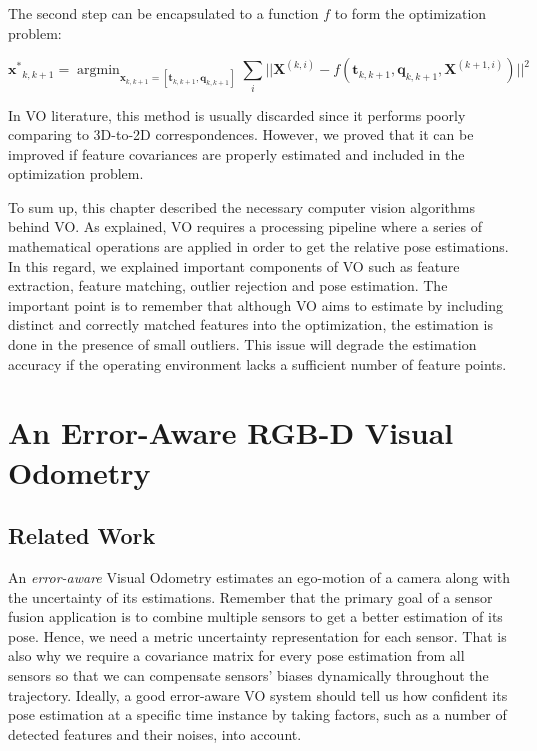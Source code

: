 \documentclass[12pt]{report}
\numberwithin{figure}{section}
\newcommand{\argmin}{\mathop{\mathrm{argmin}}}
\begin{document}
The second step can be encapsulated to a function $f$ to form the optimization 
problem:

\begin{equation}
  \mathbf{x^*}_{k,k+1} = \argmin_{\mathbf{x}_{k,k+1} = [\mathbf{t}_{k,k+1}, 
  	\mathbf{q}_{k,k+1}]}
  \sum_i||\mathbf{X}^{(k,i)} - f(\mathbf{t}_{k,k+1}, \mathbf{q}_{k,k+1}, 
  \mathbf{X}^{(k+1,i)})||^2
\end{equation}\label{eq:3d_to_3d_rel_pose_est}

In VO literature, this method is usually discarded since it performs poorly 
comparing to 3D-to-2D correspondences. However, we proved that it can be 
improved if feature covariances are properly estimated and included in the 
optimization problem.

To sum up, this chapter described the necessary computer vision
algorithms behind VO. As explained, VO requires a processing pipeline 
where a series of mathematical operations are applied in order to get 
the relative pose estimations. In this regard, we explained important 
components of VO such as feature extraction, feature matching, outlier rejection 
and pose estimation. The important point is to remember that 
although VO aims to estimate by including distinct and correctly matched 
features into the optimization, the estimation is done in the presence of 
small outliers. This issue will degrade the estimation accuracy 
if the operating environment lacks a sufficient number of feature points.


\chapter{An Error-Aware RGB-D Visual Odometry} \label{cp_covo}

\section{Related Work} \label{sc_error_aware_visual_odometry_related_works}

An \textit{error-aware} Visual Odometry estimates an ego-motion of a camera
along with the uncertainty of its estimations.  Remember that the primary goal
of a sensor fusion application is to combine multiple sensors to get a better
estimation of its pose.  Hence, we need a metric uncertainty
representation for each sensor.  That is also why we require a covariance 
matrix for
every pose estimation from all sensors so that we can compensate sensors'
biases dynamically throughout the trajectory.  Ideally, a good error-aware VO
system should tell us how confident its pose estimation at a specific time
instance by taking factors, such as a number of detected features and their
noises, into account.
\end{document}
